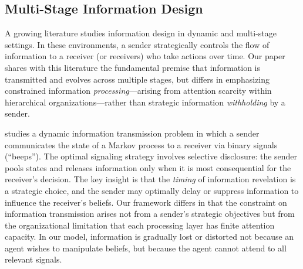

\subsection{Multi-Stage Information Design}

A growing literature studies information design in dynamic and multi-stage settings. In these environments, a sender strategically controls the flow of information to a receiver (or receivers) who take actions over time. Our paper shares with this literature the fundamental premise that information is transmitted and evolves across multiple stages, but differs in emphasizing constrained information \emph{processing}---arising from attention scarcity within hierarchical organizations---rather than strategic information \emph{withholding} by a sender.

\citet{ely2017beeps} studies a dynamic information transmission problem in which a sender communicates the state of a Markov process to a receiver via binary signals (``beeps''). The optimal signaling strategy involves selective disclosure: the sender pools states and releases information only when it is most consequential for the receiver's decision. The key insight is that the \emph{timing} of information revelation is a strategic choice, and the sender may optimally delay or suppress information to influence the receiver's beliefs. Our framework differs in that the constraint on information transmission arises not from a sender's strategic objectives but from the organizational limitation that each processing layer has finite attention capacity. In our model, information is gradually lost or distorted not because an agent wishes to manipulate beliefs, but because the agent cannot attend to all relevant signals.

